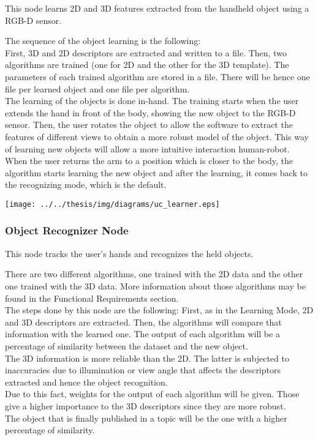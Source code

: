 \documentclass{article}
\begin{document}
\hspace{0.5cm}This node learns 2D and 3D features extracted from the handheld object using a RGB-D sensor.   

The sequence of the object learning is the following:
\\
First, 3D and 2D descriptors are extracted and written to a file. Then, two algorithms are trained (one for 2D and the other for the 3D template). The parameters of each trained algorithm are stored in a file. There will be hence one file per learned object and one file per algorithm.
\\

The learning of the objects is done in-hand. The training starts when the user extends the hand in front of the body, showing the new object to the RGB-D sensor. Then, the user rotates the object to allow the software to extract the features of different views to obtain a more robust model of the object. This way of learning new objects will allow a more intuitive interaction human-robot. When the user returns the arm to a position which is closer to the body, the algorithm starts learning the new object and after the learning, it comes back to the recognizing mode, which is the default. 

\begin{center}

		\texttt{[image: ../../thesis/img/diagrams/uc\_learner.eps]}
	\end{center}

\subsubsection{Object Recognizer Node} 
\hspace{0.5cm}This node tracks the user's hands and recognizes the held objects. 

There are two different algorithms, one trained with the 2D data and the other one trained with the 3D data. More information about those algorithms may be found in the Functional Requirements section. 
\\
The steps done by this node are the following: 
First, as in the Learning Mode, 2D and 3D descriptors are extracted. Then, the algorithms will compare that information with the learned one. 
The output of each algorithm will be a percentage of similarity between the dataset and the new object. 
\\
The 3D information is more reliable than the 2D. The latter is subjected to inaccuracies due to illumination or view angle that affects the descriptors extracted and hence the object recognition.
\\
Due to this fact, weights for the output of each algorithm will be given. Those give a higher importance to the 3D descriptors since they are more robust. 
\\
The object that is finally published in a topic will be the one with a higher percentage of similarity. 
\end{document}
